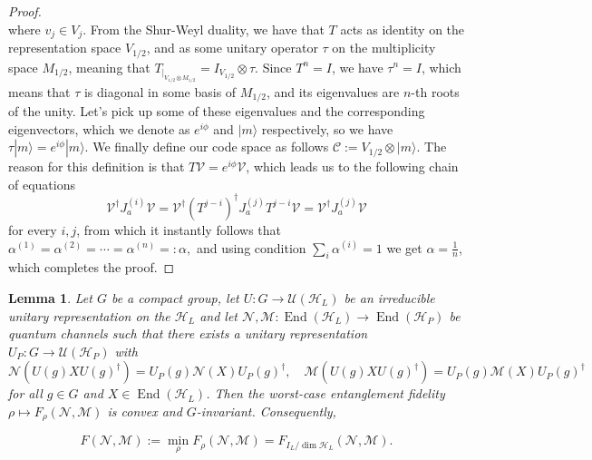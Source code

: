 \documentclass[11pt,letterpaper]{article}
\theoremstyle{plain}
\theoremstyle{plain}
\theoremstyle{plain}
\theoremstyle{plain}
\theoremstyle{plain}
\theoremstyle{plain}
\theoremstyle{plain}
\newtheorem{smlemma}[smtheorem]{Lemma}
\theoremstyle{definition}
\theoremstyle{plain}
\begin{document}
\begin{proof}
\[    \]
    where $v_j \in V_j$. From the Shur-Weyl duality, we have that $T$ acts as identity on the representation space $V_{1 / 2}$,
     and as some unitary operator $\tau$ on the multiplicity space $M_{1 / 2}$, meaning that
    $
        T_{|_{V_{1 / 2} \otimes M_{1 / 2}}}=I_{V_{1 / 2}} \otimes \tau.
    $
        Since $T^n=I$, we have $\tau^n=I$, which means that $\tau$ is diagonal in some basis of $M_{1 / 2}$, and its eigenvalues are $n$-th roots of the unity. Let's pick up
        some of these eigenvalues and the corresponding eigenvectors, which we denote as $e^{i \phi}$ and $|m\rangle$ respectively, so we have
    $
        \tau|m\rangle=e^{i \phi}|m\rangle .
    $
     We finally define our code space as follows
    $
        \mathcal{C}:=V_{1 / 2} \otimes|m\rangle.
    $
    The reason for this definition is that $T \mathcal{V}=e^{i \phi} \mathcal{V}$, which leads us to
    the following chain of equations
    \[
        \mathcal{V}^{\dagger} J_a^{(i)} \mathcal{V}=\mathcal{V}^{\dagger} (T^{j-i})^{\dagger} J_a^{(j)} T^{j-i} \mathcal{V}=\mathcal{V}^{\dagger} J_a^{(j)} \mathcal{V}
    \]
    for every $i,j$, from which it instantly follows that
    $
        \alpha^{(1)}=\alpha^{(2)}=\cdots=\alpha^{(n)}=: \alpha,
    $
    and using condition $\sum_i\alpha^{(i)}=1$ we get $\alpha=\frac{1}{n}$, which completes the proof.
\end{proof}

\begin{smlemma}\label{fidelity_opt}
Let $G$ be a compact group, let
$
U: G \rightarrow \mathcal{U}\left(\mathcal{H}_{L}\right)
$
be an irreducible unitary representation on the $\mathcal{H}_{L}$ and let
$
\mathcal{N}, \mathcal{M}: \operatorname{End}\left(\mathcal{H}_L\right) \rightarrow \operatorname{End}\left(\mathcal{H}_{P}\right)
$
be quantum channels such that there exists a unitary representation
$
U_P: G \rightarrow \mathcal{U}\left(\mathcal{H}_{P}\right)
$
with
\begin{equation}\label{eq:channel_covar}
    \mathcal{N}\left(U(g) X U(g)^{\dagger}\right)=U_P(g) \mathcal{N}(X) U_P(g)^{\dagger}, \quad \mathcal{M}\left(U(g) X U(g)^{\dagger}\right)=U_P(g) \mathcal{M}(X) U_P(g)^{\dagger}
\end{equation}
for all $g \in G$ and $X \in \operatorname{End}\left(\mathcal{H}_{L}\right)$.
Then the worst-case entanglement fidelity
$
\rho \longmapsto F_\rho(\mathcal{N}, \mathcal{M})
$
is convex and $G$-invariant. Consequently,

$$
F(\mathcal{N}, \mathcal{M}):=\min _\rho F_\rho(\mathcal{N}, \mathcal{M})=F_{I_{L} / \operatorname{dim} \mathcal{H}_{L}}(\mathcal{N}, \mathcal{M}) .
$$
\end{smlemma}
\end{document}

